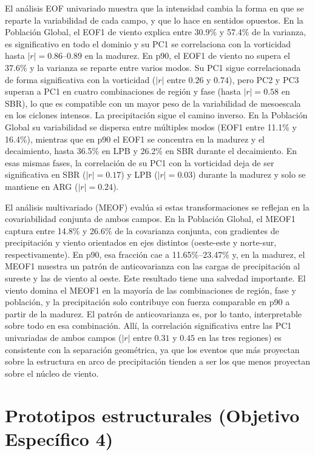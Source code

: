 El análisis EOF univariado muestra que la intensidad cambia la forma en que se reparte la variabilidad de cada campo, y que lo hace en sentidos opuestos. En la Población Global, el EOF1 de viento explica entre 30.9\% y 57.4\% de la varianza, es significativo en todo el dominio y su PC1 se correlaciona con la vorticidad hasta $|r|=0.86$--$0.89$ en la madurez. En p90, el EOF1 de viento no supera el 37.6\% y la varianza se reparte entre varios modos. Su PC1 sigue correlacionada de forma significativa con la vorticidad ($|r|$ entre $0.26$ y $0.74$), pero PC2 y PC3 superan a PC1 en cuatro combinaciones de región y fase (hasta $|r|=0.58$ en SBR), lo que es compatible con un mayor peso de la variabilidad de mesoescala en los ciclones intensos. La precipitación sigue el camino inverso. En la Población Global su variabilidad se dispersa entre múltiples modos (EOF1 entre 11.1\% y 16.4\%), mientras que en p90 el EOF1 se concentra en la madurez y el decaimiento, hasta 36.5\% en LPB y 26.2\% en SBR durante el decaimiento. En esas mismas fases, la correlación de su PC1 con la vorticidad deja de ser significativa en SBR ($|r|=0.17$) y LPB ($|r|=0.03$) durante la madurez y solo se mantiene en ARG ($|r|=0.24$).

El análisis multivariado (MEOF) evalúa si estas transformaciones se reflejan en la covariabilidad conjunta de ambos campos. En la Población Global, el MEOF1 captura entre 14.8\% y 26.6\% de la covarianza conjunta, con gradientes de precipitación y viento orientados en ejes distintos (oeste-este y norte-sur, respectivamente). En p90, esa fracción cae a 11.65\%--23.47\% y, en la madurez, el MEOF1 muestra un patrón de anticovarianza con las cargas de precipitación al sureste y las de viento al oeste. Este resultado tiene una salvedad importante. El viento domina el MEOF1 en la mayoría de las combinaciones de región, fase y población, y la precipitación solo contribuye con fuerza comparable en p90 a partir de la madurez. El patrón de anticovarianza es, por lo tanto, interpretable sobre todo en esa combinación. Allí, la correlación significativa entre las PC1 univariadas de ambos campos ($|r|$ entre $0.31$ y $0.45$ en las tres regiones) es consistente con la separación geométrica, ya que los eventos que más proyectan sobre la estructura en arco de precipitación tienden a ser los que menos proyectan sobre el núcleo de viento.

\section{Prototipos estructurales (Objetivo Específico 4)}

